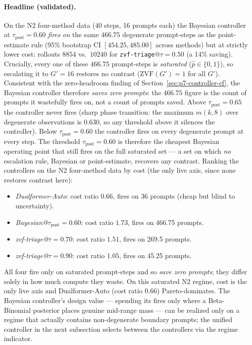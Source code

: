\documentclass{article}
\begin{document}
\paragraph{Headline (validated).}
On the N2 four-method data (40 steps, 16 prompts each) the
Bayesian controller at $\tau_{\mathrm{post}}{=}0.60$ \emph{fires on}
the same $466.75$ degenerate prompt-steps as the point-estimate
rule (95\% bootstrap CI $[454.25, 485.00]$ across methods) but at
strictly lower cost: rollouts $8854$ vs.\ $10240$ for
\texttt{zvf-triage}@$\tau{=}0.50$ (a 14\% saving). Crucially, every
one of these $466.75$ prompt-steps is \emph{saturated}
($\hat p \in \{0,1\}$), so escalating it to $G'{=}16$ restores no
contrast ($\mathrm{ZVF}(G')=1$ for all $G'$). Consistent with the
zero-headroom finding of Section~\ref{sec:p7-controller-cf}, the
Bayesian controller therefore \emph{saves zero prompts}: the
$466.75$ figure is the count of prompts it wastefully fires on, not
a count of prompts saved. Above $\tau_{\mathrm{post}}{=}0.65$ the
controller never fires (sharp phase transition: the maximum $m(k,8)$
over degenerate observations is $0.630$, so any threshold above it
silences the controller). Below $\tau_{\mathrm{post}}{=}0.60$ the
controller fires on every degenerate prompt at every step. The
threshold $\tau_{\mathrm{post}}{=}0.60$ is therefore the cheapest
Bayesian operating point that still fires on the full saturated set
--- a set on which \emph{no} escalation rule, Bayesian or
point-estimate, recovers any contrast. Ranking the controllers on
the N2 four-method data by cost (the only live axis, since none
restores contrast here):
\begin{itemize}
\item \emph{Dualformer-Auto}: cost ratio $0.66$, fires on 36 prompts (cheap but blind to uncertainty).
\item \emph{Bayesian@$\tau_{\mathrm{post}}{=}0.60$}: cost ratio $1.73$, fires on 466.75 prompts.
\item \emph{zvf-triage@$\tau{=}0.70$}: cost ratio $1.51$, fires on 269.5 prompts.
\item \emph{zvf-triage@$\tau{=}0.90$}: cost ratio $1.05$, fires on 45.25 prompts.
\end{itemize}
All four fire only on saturated prompt-steps and so \emph{save zero
prompts}; they differ solely in how much compute they waste. On this
saturated N2 regime, cost is the only live axis and Dualformer-Auto
(cost ratio $0.66$) Pareto-dominates. The Bayesian controller's
design value --- spending its fires only where a Beta-Binomial
posterior places genuine mid-range mass --- can be realized only on
a regime that actually contains non-degenerate boundary prompts; the
unified controller in the next subsection selects between the
controllers via the regime indicator.
\end{document}
